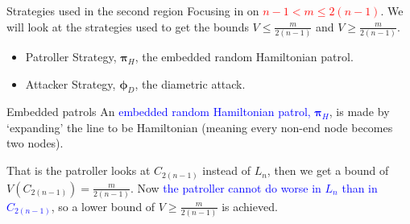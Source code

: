 \documentclass[11pt]{beamer}
\begin{document}
\begin{frame}{Strategies used in the second region}
Focusing in on \textcolor{red}{$n-1 < m \leq 2(n-1)$}. We will look at the strategies used to get the bounds $V \leq \frac{m}{2(n-1)}$ and $V \geq \frac{m}{2(n-1)}$.

\begin{itemize}
\item Patroller Strategy, $\bm{\pi}_{H}$, the embedded random Hamiltonian patrol.
\item Attacker Strategy, $\bm{\phi}_{D}$, the diametric attack.
\end{itemize}

\end{frame}

\begin{frame}{Embedded patrols}
An \textcolor{blue}{embedded random Hamiltonian patrol, $\bm{\pi}_{H}$}, is made by `expanding' the line to be Hamiltonian (meaning every non-end node becomes two nodes).

That is the patroller looks at $C_{2(n-1)}$ instead of $L_{n}$, then we get a bound of $V(C_{2(n-1)})=\frac{m}{2(n-1)}$. Now \textcolor{blue}{the patroller cannot do worse in $L_{n}$ than in $C_{2(n-1)}$}, so a lower bound of $V \geq \frac{m}{2(n-1)} $ is achieved.

\begin{figure}
\begin{center}
\end{center}
\end{figure}
\end{frame}
\end{document}

